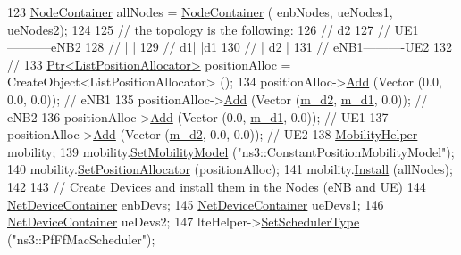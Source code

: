 \begin{DoxyCode}
123   \hyperlink{classns3_1_1NodeContainer}{NodeContainer} allNodes = \hyperlink{classns3_1_1NodeContainer}{NodeContainer} ( enbNodes, ueNodes1, ueNodes2);
124 
125   \textcolor{comment}{// the topology is the following:}
126   \textcolor{comment}{//         d2}
127   \textcolor{comment}{//  UE1-----------eNB2}
128   \textcolor{comment}{//   |             |}
129   \textcolor{comment}{// d1|             |d1}
130   \textcolor{comment}{//   |     d2      |}
131   \textcolor{comment}{//  eNB1----------UE2}
132   \textcolor{comment}{//}
133   \hyperlink{classns3_1_1Ptr}{Ptr<ListPositionAllocator>} positionAlloc = CreateObject<ListPositionAllocator> 
      ();
134   positionAlloc->\hyperlink{classns3_1_1ListPositionAllocator_a460e82f015ac012a73ba0ea0cccb3486}{Add} (Vector (0.0, 0.0, 0.0));   \textcolor{comment}{// eNB1}
135   positionAlloc->\hyperlink{classns3_1_1ListPositionAllocator_a460e82f015ac012a73ba0ea0cccb3486}{Add} (Vector (\hyperlink{classLteInterferenceHardFrTestCase_a9a04ae85ebadd45696a745d79970b8b4}{m\_d2}, \hyperlink{classLteInterferenceHardFrTestCase_aac10d46115bab60e72e82449bedbf50b}{m\_d1}, 0.0)); \textcolor{comment}{// eNB2}
136   positionAlloc->\hyperlink{classns3_1_1ListPositionAllocator_a460e82f015ac012a73ba0ea0cccb3486}{Add} (Vector (0.0, \hyperlink{classLteInterferenceHardFrTestCase_aac10d46115bab60e72e82449bedbf50b}{m\_d1}, 0.0));  \textcolor{comment}{// UE1}
137   positionAlloc->\hyperlink{classns3_1_1ListPositionAllocator_a460e82f015ac012a73ba0ea0cccb3486}{Add} (Vector (\hyperlink{classLteInterferenceHardFrTestCase_a9a04ae85ebadd45696a745d79970b8b4}{m\_d2}, 0.0, 0.0));  \textcolor{comment}{// UE2}
138   \hyperlink{classns3_1_1MobilityHelper}{MobilityHelper} mobility;
139   mobility.\hyperlink{classns3_1_1MobilityHelper_a030275011b6f40682e70534d30280aba}{SetMobilityModel} (\textcolor{stringliteral}{"ns3::ConstantPositionMobilityModel"});
140   mobility.\hyperlink{classns3_1_1MobilityHelper_ac59d5295076be3cc11021566713a28c5}{SetPositionAllocator} (positionAlloc);
141   mobility.\hyperlink{classns3_1_1MobilityHelper_a07737960ee95c0777109cf2994dd97ae}{Install} (allNodes);
142 
143   \textcolor{comment}{// Create Devices and install them in the Nodes (eNB and UE)}
144   \hyperlink{classns3_1_1NetDeviceContainer}{NetDeviceContainer} enbDevs;
145   \hyperlink{classns3_1_1NetDeviceContainer}{NetDeviceContainer} ueDevs1;
146   \hyperlink{classns3_1_1NetDeviceContainer}{NetDeviceContainer} ueDevs2;
147   lteHelper->\hyperlink{classns3_1_1LteHelper_a8f86e55b8b80a81732c4b2df00fb25d5}{SetSchedulerType} (\textcolor{stringliteral}{"ns3::PfFfMacScheduler"});

\end{DoxyCode}

